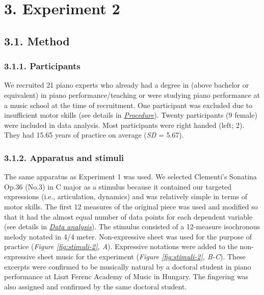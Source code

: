 \documentclass[
  english,
  man,floatsintext]{apa6}
\begin{document}
\newpage

\hypertarget{experiment-2}{%
\section{3. Experiment 2}\label{experiment-2}}

\hypertarget{method-1}{%
\subsection{3.1. Method}\label{method-1}}

\hypertarget{participants-1}{%
\subsubsection{3.1.1. Participants}\label{participants-1}}

We recruited 21 piano experts who already had a degree in (above bachelor or equivalent) in piano performance/teaching or were studying piano performance at a music school at the time of recruitment. One participant was excluded due to insufficient motor skills (see details in \emph{\protect\hyperlink{procedure-2}{Procedure}}). Twenty participants (9 female) were included in data analysis. Most participants were right handed (left; 2). They had 15.65 years of practice on average (\emph{SD} = 5.67).

\hypertarget{apparatus-and-stimuli-1}{%
\subsubsection{3.1.2. Apparatus and stimuli}\label{apparatus-and-stimuli-1}}

The same apparatus as Experiment 1 was used. We selected Clementi's Sonatina Op.36 (No.3) in C major as a stimulus because it contained our targeted expressions (i.e., articulation, dynamics) and was relatively simple in terms of motor skills. The first 12 measures of the original piece was used and modified so that it had the almost equal number of data points for each dependent variable (see details in \emph{\protect\hyperlink{analysis-2}{Data analysis}}). The stimulus consisted of a 12-measure isochronous melody notated in 4/4 meter. Non-expressive sheet was used for the purpose of practice (\emph{Figure \ref{fig:stimuli-2}, A}). Expressive notations were added to the non-expressive sheet music for the experiment (\emph{Figure \ref{fig:stimuli-2}, B-C}). These excerpts were confirmed to be musically natural by a doctoral student in piano performance at Liszt Ferenc Academy of Music in Hungary. The fingering was also assigned and confirmed by the same doctoral student.
\end{document}
